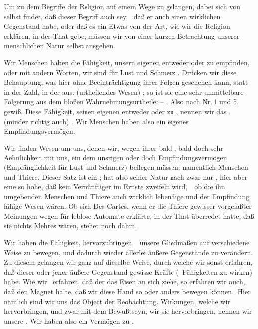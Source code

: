 Um zu dem Begriffe der Religion auf einem Wege zu gelangen, dabei sich von selbst findet, daß dieser Begriff auch  sey, \dh\ daß er auch einen wirklichen Gegenstand habe, oder daß es ein Etwas von der Art, wie wir die Religion erklären, in der That gebe, müssen wir von einer kurzen Betrachtung unserer menschlichen Natur selbst ausgehen.
\begin{aufza}
\item Wir Menschen haben die Fähigkeit, unsern eigenen  entweder  oder  zu empfinden, oder mit andern Worten, wir sind für Lust und Schmerz . Drücken wir diese Behauptung, was hier ohne Beeinträchtigung ihrer Folgen geschehen kann, statt in der  Zahl, in der  aus:  (urtheilendes Wesen) ; so ist sie eine sehr unmittelbare Folgerung aus dem bloßen Wahrnehmungsurtheile:  -- . Also nach  Nr.\,1 und 5. gewiß. Diese Fähigkeit, seinen eigenen  entweder  oder  zu , nennen wir das , (minder richtig auch) . Wir Menschen haben also ein eigenes Empfindungsvermögen.
\item Wir finden Wesen um uns, denen wir, wegen ihrer bald , bald doch sehr  Aehnlichkeit mit uns, ein dem unsrigen  oder doch  Empfindungsvermögen (Empfänglichkeit für Lust und Schmerz) beilegen müssen; namentlich Menschen und Thiere. Dieser Satz ist ein ; hat also seiner Natur nach zwar nur , hier aber eine so hohe, daß kein Vernünftiger im Ernste zweifeln wird,~\ ob die ihn umgebenden Menschen und Thiere auch wirklich lebendige und der Empfindung fähige Wesen wären. Ob sich Des Cartes, wenn er die Thiere gewisser vorgefaßter Meinungen wegen für leblose Automate erklärte, in der That überredet hatte, daß sie nichts Mehres wären, stehet noch dahin.
\item Wir haben die Fähigkeit,  hervorzubringen, \zB\ unsere Gliedmaßen auf verschiedene Weise zu bewegen, und dadurch wieder allerlei äußere Gegenstände zu verändern. Zu diesem  gelangen wir ganz auf dieselbe Weise, durch welche wir sonst erfahren, daß dieser oder jener äußere Gegenstand gewisse Kräfte (\dh\ Fähigkeiten zu wirken) habe. Wie wir \zB\ erfahren, daß der  das Eisen an sich ziehe, so erfahren wir auch, daß  den Magnet halte, daß wir diese Hand so oder anders bewegen können \usw\ Hier nämlich sind wir uns  das Object der Beobachtung. Wirkungen, welche wir  hervorbringen, und zwar mit dem Bewußtseyn,  wir sie hervorbringen, nennen wir unsere . Wir haben also ein Vermögen zu .

\end{aufza}

